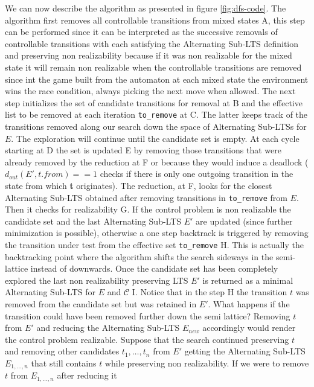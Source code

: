 We can now describe the algorithm as
presented in figure \ref{fig:dfs-code}. The algorithm first removes all controllable transitions from
mixed states A, this step can be performed since it
can be interpreted as the successive removals of controllable 
transitions with each satisfying the Alternating Sub-LTS definition 
and preserving non realizability because if it was non realizable
for the mixed state it will remain non realizable when the controllable transitions are removed since int the game built from
the automaton at each mixed state the environment
wins the race condition, always picking the next move when allowed.
The next step initializes the set of 
candidate transitions
for removal at B and the effective list
to be removed at each iteration \texttt{to\_remove} at
C.  The latter keeps track of the transitions
removed along our search down the space of
Alternating Sub-LTSs for $E$.  The exploration
will continue until the candidate set is empty.
At each cycle starting at D the set is updated E by 
removing those transitions that were already removed by the reduction
at F or because they would induce a deadlock 
($d_{out}(E', t.from) == 1$ checks if there is only one
outgoing transition in the state from which \textbf{t} originates).
The
reduction, at F, looks for the closest
Alternating Sub-LTS obtained after removing 
transitions in \texttt{to\_remove} from $E$.
Then it checks for realizability G.  If the control problem is non
realizable the candidate set and the last 
Alternating Sub-LTS $E'$ are updated (since further minimization is 
possible), otherwise a one step backtrack
is triggered by removing the transition under test from
the effective set \texttt{to\_remove} H.
This is actually the backtracking point where the algorithm
shifts the search sideways in the semi-lattice instead of downwards.
Once the candidate set has been completely explored
the last non realizability preserving LTS $E'$ is
returned as a minimal Alternating Sub-LTS
for $E$ and $\mathcal{C}$ I.
Notice that
in the step H the transition $t$ was removed
from the candidate set but was retained in $E'$.  What happens if
the transition could have been removed further down the semi lattice?  Removing $t$ from $E'$ and reducing the Alternating Sub-LTS 
$E_{new}$ accordingly would render the control problem realizable.  Suppose that
the search continued preserving $t$ and removing other candidates
$t_1, \ldots, t_n$ from $E'$ getting the Alternating Sub-LTS
$E_{1,\ldots,n}$ that still contains $t$ while preserving non realizability.
If we were to remove $t$ from $E_{1,\ldots,n}$ after reducing it
